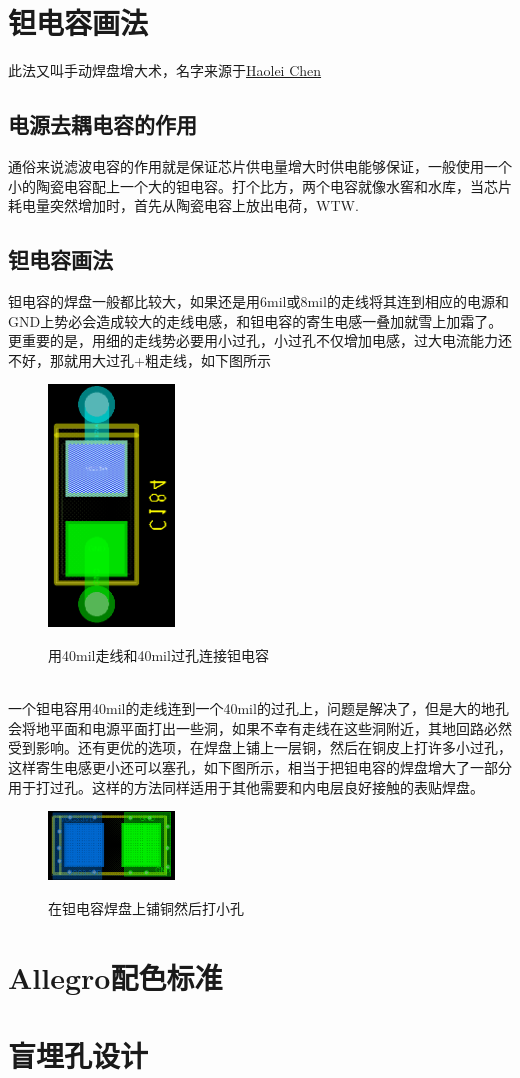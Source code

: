 \documentclass[a4paper,twoside]{article}
\begin{document}
\section{钽电容画法}
此法又叫手动焊盘增大术，名字来源于\href{mailto:chl1111@mail.ustc.edu.cn}{Haolei Chen}
\subsection{电源去耦电容的作用}
通俗来说滤波电容的作用就是保证芯片供电量增大时供电能够保证，一般使用一个小的陶瓷电容配上一个大的钽电容。打个比方，两个电容就像水窖和水库，当芯片耗电量突然增加时，首先从陶瓷电容上放出电荷，WTW.
\subsection{钽电容画法}
钽电容的焊盘一般都比较大，如果还是用6mil或8mil的走线将其连到相应的电源和GND上势必会造成较大的走线电感，和钽电容的寄生电感一叠加就雪上加霜了。更重要的是，用细的走线势必要用小过孔，小过孔不仅增加电感，过大电流能力还不好，那就用大过孔+粗走线，如下图所示
\begin{figure}[htbp]
	\centering
	\includegraphics[width=0.3\textwidth]{figures/CapacitorWith40milVia.png}
	\label{Fig:CapacitorWith40milVia}
	\caption{用40mil走线和40mil过孔连接钽电容}
\end{figure}
\\一个钽电容用40mil的走线连到一个40mil的过孔上，问题是解决了，但是大的地孔会将地平面和电源平面打出一些洞，如果不幸有走线在这些洞附近，其地回路必然受到影响。还有更优的选项，在焊盘上铺上一层铜，然后在铜皮上打许多小过孔，这样寄生电感更小还可以塞孔，如下图所示，相当于把钽电容的焊盘增大了一部分用于打过孔。这样的方法同样适用于其他需要和内电层良好接触的表贴焊盘。
\begin{figure}[htbp]
	\centering
	\includegraphics[width=0.3\textwidth]{figures/CapacitorWithShape.png}
	\label{fig:CapacitorWithShape}
	\caption{在钽电容焊盘上铺铜然后打小孔}
\end{figure}
\section{Allegro配色标准}
\section{盲埋孔设计}
\end{document}
